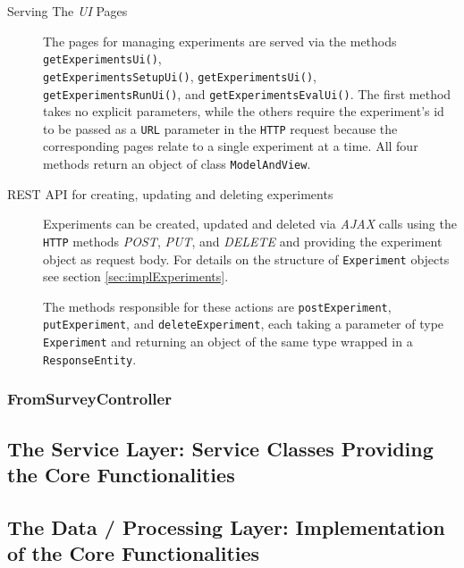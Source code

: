 \documentclass[a4paper]{usiinfbachelorproject}
\begin{document}
    \begin{description}

        \item[Serving The \emph{UI} Pages]
        The pages for managing experiments are served via the methods \texttt{getExperimentsUi()}, 
        \\ \texttt{getExperimentsSetupUi()},
        \texttt{getExperimentsUi()}, \texttt{getExperimentsRunUi()}, and \texttt{getExperimentsEvalUi()}.
        The first method takes no explicit parameters, while the others require the experiment's id to be passed as a \texttt{URL}
        parameter in the \texttt{HTTP} request because the corresponding pages relate to a single experiment at a time.
        All four methods return an object of class \texttt{ModelAndView}.

        \item[REST API for creating, updating and deleting experiments]
        Experiments can be created, updated and deleted via \emph{AJAX} calls using the \texttt{HTTP} methods
        \emph{POST}, \emph{PUT}, and \emph{DELETE} and providing the experiment object as request body. For
        details on the structure of \texttt{Experiment} objects see section \ref{sec:implExperiments}.

        The methods responsible for these actions are \texttt{postExperiment}, \texttt{putExperiment}, and
        \texttt{deleteExperiment}, each taking a parameter of type \texttt{Experiment} and returning an
        object of the same type wrapped in a \texttt{ResponseEntity}.

    \end{description}

\subsubsection{\textbf{FromSurveyController}}


\subsection{\textbf{The Service Layer: Service Classes Providing the Core Functionalities}} \label{sec:archServiceLayer}

\subsection{\textbf{The Data / Processing Layer: Implementation of the Core Functionalities}} \label{sec:archDataLayer}
\end{document}
